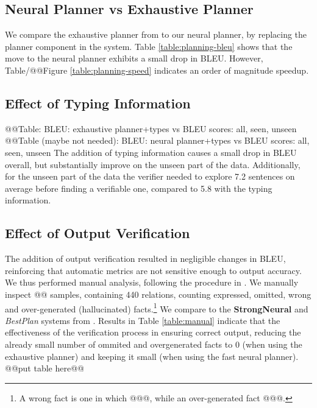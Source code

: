 \subsection{Neural Planner vs Exhaustive Planner}
\label{eval:planner}

We compare the exhaustive planner from \citet{step-by-step} to our neural planner, by replacing the planner component in the \citet{step-by-step} system. Table \ref{table:planning-bleu} shows that the move to the neural planner exhibits a small drop in BLEU. However, Table/@@Figure \ref{table:planning-speed} indicates an order of magnitude speedup.

\subsection{Effect of Typing Information}
\label{eval:typing}
@@Table: BLEU: exhaustive planner+types vs BLEU scores: all, seen, unseen
@@Table (maybe not needed): BLEU: neural planner+types vs BLEU scores: all, seen, unseen
The addition of typing information causes a small drop in BLEU overall, but substantially improve on the unseen part of the data. Additionally, for the unseen part of the data the verifier needed to explore 7.2 sentences on average before finding a verifiable one, compared to 5.8 with the typing information.

\subsection{Effect of Output Verification}
\label{eval:verification}
The addition of output verification resulted in negligible changes in BLEU, reinforcing that automatic metrics are not sensitive enough to output accuracy. We thus performed manual analysis, following the procedure in \citet{step-by-step}. We manually inspect @@ samples, containing 440 relations, counting expressed, omitted, wrong and over-generated (hallucinated) facts.\footnote{A wrong fact is one in which @@@, while an over-generated fact @@@.} We compare to the \textbf{StrongNeural} and \emph{BestPlan} systems from \citet{step-by-step}. Results in Table \ref{table:manual} indicate that the effectiveness of the verification process in ensuring correct output, reducing the already small number of ommited and overgenerated facts to 0 (when using the exhaustive planner) and keeping it small (when using the fast neural planner).     
@@put table here@@

